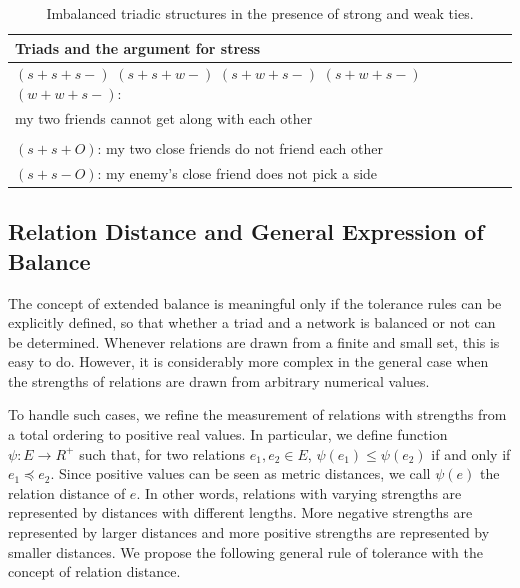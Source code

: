 \begin{table}[htbp!]
\begin{center}
 \begin{tabular}{p{3in}}
Triads and  the argument for stress \\ \hline
$(s+ s+ s-)$ $(s+ s+ w-)$ $(s+ w+ s-)$ $(s+ w+ s-)$ $(w+ w+ s-):$ \\
my two friends cannot get along with each other \\ \\

$(s+ s+ O)$: my two close friends do not friend each other \\ 
$(s+ s- O)$: my enemy's close friend does not pick a side\\ 
\end{tabular} \vspace{4mm}
\caption{\label{tab:imbalanced_extended} Imbalanced triadic structures
  in the presence of strong and weak ties.} 
\end{center}
\end{table}
\vspace*{0in}

\subsection{Relation Distance and General Expression of Balance}
The concept of extended balance is meaningful only if the tolerance
rules can be explicitly defined, so that whether a triad and a network
is balanced or not can be determined. Whenever relations
are drawn from a finite and small set, this is easy to do. However, it
is considerably more complex in the general case when the strengths
of relations are drawn from arbitrary numerical values. 

To handle such cases, we refine the measurement of relations with
strengths from a total ordering to positive real values. In
particular, we define function $\psi: E \rightarrow R^{+}$ such that,
for two relations $e_{1}, e_{2} \in E$, $\psi(e_{1}) \leq \psi(e_{2})$
if and only if $e_{1} \preceq e_{2}$.  Since positive values can be
seen as metric distances, we call $\psi(e)$ the relation distance of
$e$.  In other words, relations with varying strengths are represented
by distances with different lengths.  More negative strengths are
represented by larger distances and more positive strengths are
represented by smaller distances. We propose the following general
rule of tolerance with the concept of relation distance.


